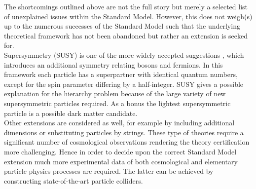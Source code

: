 The shortcomings outlined above are not the full story but merely a selected list of unexplained issues within the Standard Model. 
However, this does not weigh(s) up to the numerous successes of the Standard Model such that the underlying theoretical framework has not been abandoned but rather an extension is seeked for.
\\
Supersymmetry (SUSY) is one of the more widely accepted suggestions%
, which introduces an additional symmetry relating bosons and fermions.
In this framework each particle has a superpartner with identical quantum numbers, except for the spin parameter differing by a half-integer.
SUSY gives a possible explanation for the hierarchy problem because of the large variety of new supersymmetric particles required. 
As a bonus the lightest supersymmetric particle is a possible dark matter candidate.
\\
Other extensions are considered as well, for example by including additional dimensions or substituting particles by strings. These type of theories require a significant number of cosmological observations rendering the theory certification more challenging. %
Hence in order to decide upon the correct Standard Model extension much more experimental data of both cosmological and elementary particle physics processes are required. The latter can be achieved by constructing state-of-the-art particle colliders.

